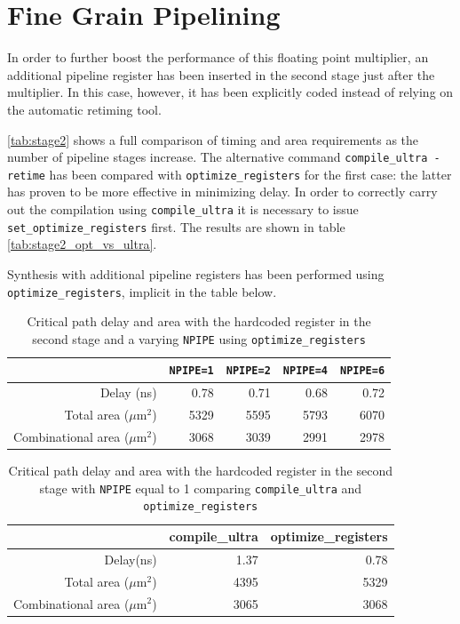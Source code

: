 \section{Fine Grain Pipelining}
In order to further boost the performance of this floating point multiplier, an additional pipeline register has been inserted in the second stage just after the multiplier. In this case, however, it has been explicitly coded instead of relying on the automatic retiming tool.

\autoref{tab:stage2} shows a full comparison of timing and area requirements as the number of pipeline stages increase. The alternative command \texttt{compile\_ultra -retime} has been compared with \texttt{optimize\_registers} for the first case: the latter has proven to be more effective in minimizing delay. In order to correctly carry out the compilation using \texttt{compile\_ultra} it is necessary to issue \texttt{set\_optimize\_registers} first. The results are shown in table \autoref{tab:stage2_opt_vs_ultra}. 

Synthesis with additional pipeline registers has been performed using \texttt{optimize\_registers}, implicit in the table below.

\begin{table}[htbp]
    \centering
	\begin{tabular}{|r|r|r|r|r|}
	\hline
	                       &\texttt{NPIPE=1} & \texttt{NPIPE=2} & \texttt{NPIPE=4} & \texttt{NPIPE=6}\\\hline
	Delay (ns)                  & 0.78             & 0.71             & 0.68             & 0.72 \\\hline
    Total area  ($\mu$m$^2$)           & 5329             & 5595             & 5793             & 6070 \\\hline
    Combinational area  ($\mu$m$^2$)   & 3068             & 3039             & 2991             & 2978 \\\hline
	\end{tabular}
	\caption{Critical path delay and area with the hardcoded register in the second stage and a varying \texttt{NPIPE} using \texttt{optimize\_registers}}
	\label{tab:stage2}
\end{table}

\begin{table}[htbp]
	\centering
	\begin{tabular}{|r|r|r|}
		\hline
		& compile\_ultra 	& optimize\_registers \\\hline
		Delay(ns)     		& 1.37				& 0.78  \\\hline
		Total area  ($\mu$m$^2$)        	& 4395 				& 5329   \\\hline
		Combinational area  ($\mu$m$^2$)	& 3065 				& 3068   \\\hline
	\end{tabular}
	\caption{Critical path delay and area with the hardcoded register in the second stage with \texttt{NPIPE} equal to 1 comparing \texttt{compile\_ultra} and \texttt{optimize\_registers}}
	\label{tab:stage2_opt_vs_ultra}
\end{table}


